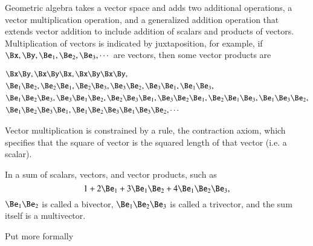 %
%
Geometric algebra takes a vector space and adds two additional operations, a vector multiplication operation, and a generalized addition operation that extends vector addition to include addition of scalars and products of vectors.
Multiplication of vectors is indicated by juxtaposition, for example, if \( \Bx, \By, \Be_1, \Be_2, \Be_3, \cdots \) are vectors, then some vector products are

\begin{dmath}\label{eqn:multivector:20}
\begin{aligned}
&\Bx \By, \Bx \By \Bx, \Bx \By \Bx \By, \\
&\Be_1 \Be_2, \Be_2 \Be_1, \Be_2 \Be_3, \Be_3 \Be_2, \Be_3 \Be_1, \Be_1 \Be_3, \\
&\Be_1 \Be_2 \Be_3, \Be_3 \Be_1 \Be_2, \Be_2 \Be_3 \Be_1, \Be_3 \Be_2 \Be_1, \Be_2 \Be_1 \Be_3, \Be_1 \Be_3 \Be_2, \\
&\Be_1 \Be_2 \Be_3 \Be_1, \Be_1 \Be_2 \Be_3 \Be_1 \Be_3 \Be_2, \cdots
\end{aligned}
\end{dmath}

Vector multiplication is constrained by a rule, the contraction axiom, which specifies that the square of vector is the squared length of that vector (i.e. a scalar).

In a sum of scalars, vectors, and vector products, such as
\begin{dmath}\label{eqn:multivector:40}
1 + 2 \Be_1 + 3 \Be_1 \Be_2 + 4 \Be_1 \Be_2 \Be_3,
\end{dmath}
\( \Be_1 \Be_2 \) is called a bivector, \( \Be_1 \Be_2 \Be_3 \) is called a trivector, and the sum itself is a multivector.

Put more formally


